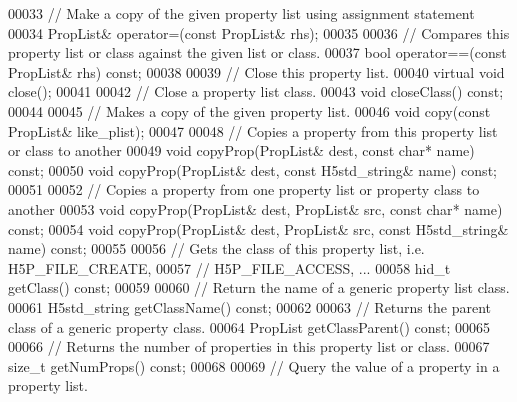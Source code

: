 \begin{DoxyCode}
00033         \textcolor{comment}{// Make a copy of the given property list using assignment statement}
00034         PropList& operator=(\textcolor{keyword}{const} PropList& rhs);
00035 
00036         \textcolor{comment}{// Compares this property list or class against the given list or class.}
00037         \textcolor{keywordtype}{bool} operator==(\textcolor{keyword}{const} PropList& rhs) \textcolor{keyword}{const};
00038 
00039         \textcolor{comment}{// Close this property list.}
00040         \textcolor{keyword}{virtual} \textcolor{keywordtype}{void} close();
00041 
00042         \textcolor{comment}{// Close a property list class.}
00043         \textcolor{keywordtype}{void} closeClass() \textcolor{keyword}{const};
00044 
00045         \textcolor{comment}{// Makes a copy of the given property list.}
00046         \textcolor{keywordtype}{void} copy(\textcolor{keyword}{const} PropList& like\_plist);
00047 
00048         \textcolor{comment}{// Copies a property from this property list or class to another}
00049         \textcolor{keywordtype}{void} copyProp(PropList& dest, \textcolor{keyword}{const} \textcolor{keywordtype}{char}* name) \textcolor{keyword}{const};
00050         \textcolor{keywordtype}{void} copyProp(PropList& dest, \textcolor{keyword}{const} H5std\_string& name) \textcolor{keyword}{const};
00051 
00052         \textcolor{comment}{// Copies a property from one property list or property class to another}
00053         \textcolor{keywordtype}{void} copyProp(PropList& dest, PropList& src, \textcolor{keyword}{const} \textcolor{keywordtype}{char}* name) \textcolor{keyword}{const};
00054         \textcolor{keywordtype}{void} copyProp(PropList& dest, PropList& src, \textcolor{keyword}{const} H5std\_string& name) \textcolor{keyword}{const};
00055 
00056         \textcolor{comment}{// Gets the class of this property list, i.e. H5P\_FILE\_CREATE,}
00057         \textcolor{comment}{// H5P\_FILE\_ACCESS, ...}
00058         hid\_t getClass() \textcolor{keyword}{const};
00059 
00060         \textcolor{comment}{// Return the name of a generic property list class.}
00061         H5std\_string getClassName() \textcolor{keyword}{const};
00062 
00063         \textcolor{comment}{// Returns the parent class of a generic property class.}
00064         PropList getClassParent() \textcolor{keyword}{const};
00065 
00066         \textcolor{comment}{// Returns the number of properties in this property list or class.}
00067         \textcolor{keywordtype}{size\_t} getNumProps() \textcolor{keyword}{const};
00068 
00069         \textcolor{comment}{// Query the value of a property in a property list.}

\end{DoxyCode}
